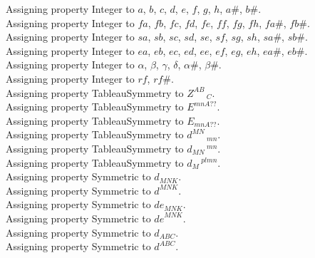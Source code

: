 \documentclass[11pt]{article}
\begin{document}
Assigning property Integer to $a$, $b$, $c$, $d$, $e$, $f$, $g$, $h$, $a\#$, $b\#$.
\\
Assigning property Integer to $fa$, $fb$, $fc$, $fd$, $fe$, $ff$, $fg$, $fh$, $fa\#$, $fb\#$.
\\
Assigning property Integer to $sa$, $sb$, $sc$, $sd$, $se$, $sf$, $sg$, $sh$, $sa\#$, $sb\#$.
\\
Assigning property Integer to $ea$, $eb$, $ec$, $ed$, $ee$, $ef$, $eg$, $eh$, $ea\#$, $eb\#$.
\\
Assigning property Integer to $\alpha$, $\beta$, $\gamma$, $\delta$, $\alpha\#$, $\beta\#$.
\\
Assigning property Integer to $rf$, $rf\#$.
\\
Assigning property TableauSymmetry to ${Z}^{A B}\,_{C}$.
\\
Assigning property TableauSymmetry to ${E}^{m n A??}$.
\\
Assigning property TableauSymmetry to ${E}_{m n A??}$.
\\
Assigning property TableauSymmetry to ${d}^{M N}\,_{m n}$.
\\
Assigning property TableauSymmetry to ${d}_{M N}\,^{m n}$.
\\
Assigning property TableauSymmetry to ${d}_{M}\,^{p l m n}$.
\\
Assigning property Symmetric to ${d}_{M N K}$.
\\
Assigning property Symmetric to ${d}^{M N K}$.
\\
Assigning property Symmetric to ${de}_{M N K}$.
\\
Assigning property Symmetric to ${de}^{M N K}$.
\\
Assigning property Symmetric to ${d}_{A B C}$.
\\
Assigning property Symmetric to ${d}^{A B C}$.
\\
\end{document}
